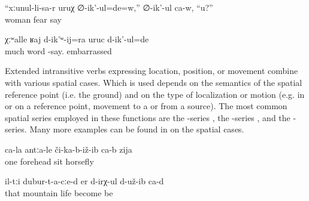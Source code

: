 \begin{exe}
	\ex	\label{ex:experiential compound verbs}
	\begin{xlist}
		\ex	{} 	
		\ex	{} 
		\ex	{} 
		\ex	{} 
	\end{xlist}

	\ex	\label{ex:Are you afraid of your wife? he says.}
	\gll	``xːunul-li-sa-r	uruχ	∅-ik'-ul=de=w,''	∅-ik'-ul	ca-w,	``u?''\\
		woman	fear	 say		\\
	\glt	{}

	\ex	\label{ex:We were embarrassed to talk a lot.}
	\gll χːʷalle	ʁaj	d-ik'ʷ-ij=ra	uruc d-ik'-ul=de\\
		much	word	-say.	embarrassed \\
		\glt	{}
\end{exe}


	
		
Extended intransitive verbs expressing location, position, or movement combine with various spatial cases. Which  is used depends on the semantics of the spatial reference point (i.e. the ground) and on the type of localization or motion (e.g. in or on a reference point, movement to a  or from a source). The most common spatial series employed in these functions are the -series , the -series , and the -series. Many more examples can be found in  on the spatial cases.

\begin{exe}
	\ex	\label{ex:A horsefly sat down on the forehead of one (man)}
	\gll	ca-la	antːa-le	či-ka-b-iž-ib	ca-b	zija\\
		one	forehead	sit		horsefly\\
	\glt	{}

	\ex	\label{ex:(Apparently) they (=the animals) lived in the mountains}
	\gll	il-tːi	dubur-t-a-cːe-d	er	d-irχ-ul	d-už-ib	ca-d\\
		that	mountain	life	become	be \\
	\glt	{}
\end{exe}

